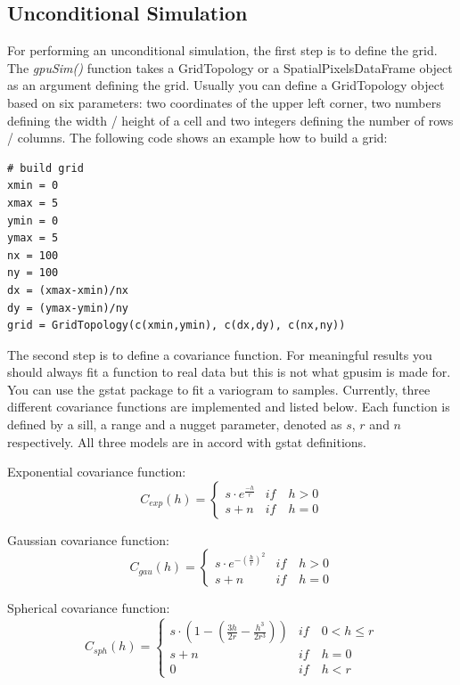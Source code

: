 \documentclass[12pt,oneside,a4paper]{article}
\begin{document}
\subsection{Unconditional Simulation}
For performing an unconditional simulation, the first step is to define the grid. The \emph{gpuSim()} function takes a GridTopology or a SpatialPixelsDataFrame object as an argument defining the grid. Usually you can define a GridTopology object based on six parameters: two coordinates of the upper left corner, two numbers defining the width / height of a cell and two integers defining the number of rows / columns. The following code shows an example how to build a grid:

\begin{verbatim}
# build grid
xmin = 0
xmax = 5
ymin = 0
ymax = 5
nx = 100
ny = 100
dx = (xmax-xmin)/nx
dy = (ymax-ymin)/ny
grid = GridTopology(c(xmin,ymin), c(dx,dy), c(nx,ny))
\end{verbatim}


The second step is to define a covariance function. For meaningful results you should always fit a function to real data but this is not what gpusim is made for. You can use the gstat package \cite{pkg:gstat} to fit a variogram to samples.
Currently, three different covariance functions are implemented and listed below. Each function is defined by a sill, a range and a nugget parameter, denoted as $s$, $r$ and $n$ respectively. All three models are in accord with gstat definitions.


Exponential covariance function:
\begin{displaymath}
  C_{exp}(h) = 
   \left\{ 
    \begin{array}{cc}
                 s \cdot e^{\frac{-h}{r}} & if \quad h > 0  \\
                 s + n & if \quad h = 0  
    \end{array} 
   \right.
\end{displaymath}
 
 
Gaussian covariance function:
\begin{displaymath}
  C_{gau}(h) = 
   \left\{ 
    \begin{array}{cc}
                 s \cdot e^{-\left(\frac{h}{r}\right)^{2}} & if \quad h > 0  \\
                 s + n & if \quad h = 0  
    \end{array} 
   \right.
\end{displaymath}
 
 
Spherical covariance function:
\begin{displaymath}
  C_{sph}(h) = 
   \left\{ 
    \begin{array}{cc}
                 s \cdot\left( 1 - \left( \frac{3h}{2r} - \frac{h^3}{2r^3} \right) \right) & if \quad 0 < h \leq r  \\           
                 s + n & if \quad h = 0 \\
                 0 & if \quad h < r
                 
    \end{array} 
   \right.
\end{displaymath}
 
\end{document}
